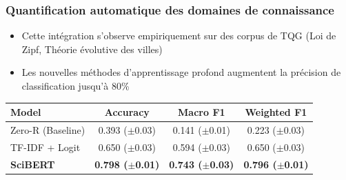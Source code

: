 \documentclass[english,10pt]{beamer}
\begin{document}
\begin{frame}
\frametitle{Quantification automatique des domaines de connaissance}


\begin{itemize}
	\item Cette intégration s'observe empiriquement sur des corpus de TQG (Loi de Zipf, Théorie évolutive des villes) \cite{raimbault2025mapping}
	\item Les nouvelles méthodes d'apprentissage profond augmentent la précision de classification jusqu'à 80\% \cite{raimbault2026classifying}
\end{itemize}

\medskip

\begin{center}

	
\begin{tabular}{l|ccc}
            \hline
            \textbf{Model} & \textbf{Accuracy} & \textbf{Macro F1} & \textbf{Weighted F1} \\
            \hline
            Zero-R (Baseline) & 0.393 ($\pm$0.03) & 0.141 ($\pm$0.01) & 0.223 ($\pm$0.03) \\ 
            TF-IDF + Logit    & 0.650 ($\pm$0.03) & 0.594 ($\pm$0.03) & 0.650 ($\pm$0.03) \\
            \textbf{SciBERT}  & \textbf{0.798 ($\pm$0.01)} & \textbf{0.743 ($\pm$0.03)} & \textbf{0.796 ($\pm$0.01)} \\
            \hline
        \end{tabular}

\end{center}


\end{frame}
\end{document}
